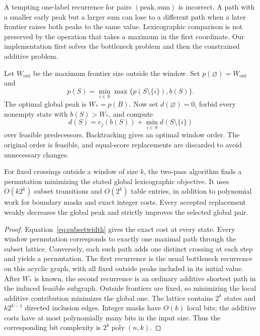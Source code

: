 A tempting one-label recurrence for pairs $(\text{peak},\text{sum})$ is
incorrect. A path with a smaller early peak but a larger sum can lose to a
different path when a later frontier raises both peaks to the same value.
Lexicographic comparison is not preserved by the operation that takes a
maximum in the first coordinate. Our implementation first solves the
bottleneck problem and then the constrained additive problem.

Let $W_{\mathrm{out}}$ be the maximum frontier size outside the window. Set
$p(\varnothing)=W_{\mathrm{out}}$ and
\[
 p(S)=\min_{i\in S}\max\{p(S\setminus\{i\}),b(S)\}.
\]
The optimal global peak is $W_*=p(B)$. Now set $d(\varnothing)=0$, forbid
every nonempty state with $b(S)>W_*$, and compute
\[
 d(S)=c_j(b(S))+\min_{i\in S}d(S\setminus\{i\})
\]
over feasible predecessors. Backtracking gives an optimal window order.
The original order is feasible, and equal-score replacements are discarded
to avoid unnecessary changes.

\begin{theorem}\label{thm:window}
For fixed crossings outside a window of size $k$, the two-pass algorithm
finds a permutation minimizing the stated global lexicographic objective.
It uses $O(k2^k)$ subset transitions and $O(2^k)$ table entries, in addition
to polynomial work for boundary masks and exact integer costs. Every
accepted replacement weakly decreases the global peak and strictly improves
the selected global pair.
\end{theorem}
\begin{proof}
Equation~\eqref{eq:subsetwidth} gives the exact cost at every state. Every
window permutation corresponds to exactly one maximal path through the
subset lattice. Conversely, each such path adds one distinct crossing at
each step and yields a permutation. The first recurrence is the usual
bottleneck recurrence on this acyclic graph, with all fixed outside peaks
included in its initial value. After $W_*$ is known, the second recurrence
is an ordinary additive shortest path in the induced feasible subgraph.
Outside frontiers are fixed, so minimizing the local additive contribution
minimizes the global one. The lattice contains $2^k$ states and
$k2^{k-1}$ directed inclusion edges. Integer masks have $O(k)$ local bits;
the additive costs have at most polynomially many bits in the input size.
Thus the corresponding bit complexity is $2^k\operatorname{poly}(n,k)$.
\end{proof}

